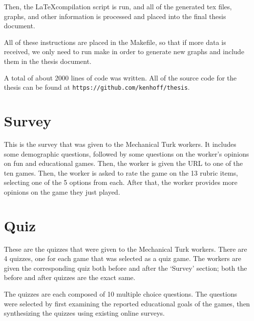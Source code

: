 		Then, the \LaTeX compilation script is run, and all of the generated tex files, graphs, and other information is processed and placed into the final thesis document.

		All of these instructions are placed in the Makefile, so that if more data is received, we only need to run make in order to generate new graphs and include them in the thesis document.

		A total of about 2000 lines of code was written. All of the source code for the thesis can be found at \texttt{https://github.com/kenhoff/thesis}. 

	\section{Survey}
		This is the survey that was given to the Mechanical Turk workers. It includes some demographic questions, followed by some questions on the worker's opinions on fun and educational games. Then, the worker is given the URL to one of the ten games. Then, the worker is asked to rate the game on the 13 rubric items, selecting one of the 5 options from each. After that, the worker provides more opinions on the game they just played.



	\section{Quiz}
		These are the quizzes that were given to the Mechanical Turk workers. There are 4 quizzes, one for each game that was selected as a quiz game. The workers are given the corresponding quiz both before and after the `Survey' section; both the before and after quizzes are the exact same.

		The quizzes are each composed of 10 multiple choice questions. The questions were selected by first examining the reported educational goals of the games, then synthesizing the quizzes using existing online surveys.





\newpage
	
